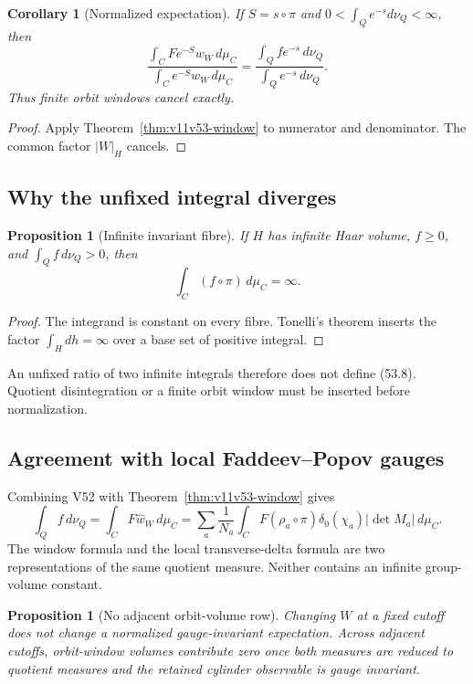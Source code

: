 \documentclass[11pt]{article}
\newtheorem{proposition}[theorem]{Proposition}
\newtheorem{corollary}[theorem]{Corollary}
\begin{document}
\begin{corollary}[Normalized expectation]
\label{cor:v11v53-normalized}
If \(S=s\circ\pi\) and
\(0<\int_Qe^{-s}d\nu_Q<\infty\), then
\[
 \frac{\int_CF e^{-S}w_W\,d\mu_C}
      {\int_Ce^{-S}w_W\,d\mu_C}
 =\frac{\int_Qf e^{-s}\,d\nu_Q}
       {\int_Qe^{-s}\,d\nu_Q}.                               \tag{53.8}
\]
Thus finite orbit windows cancel exactly.
\end{corollary}

\begin{proof}
Apply Theorem~\ref{thm:v11v53-window} to numerator and denominator.
The common factor \(|W|_H\) cancels.
\end{proof}

\subsection{Why the unfixed integral diverges}

\begin{proposition}[Infinite invariant fibre]
\label{prop:v11v53-divergence}
If \(H\) has infinite Haar volume, \(f\ge0\), and
\(\int_Qf\,d\nu_Q>0\), then
\[
                         \int_C(f\circ\pi)\,d\mu_C=\infty.     \tag{53.9}
\]
\end{proposition}

\begin{proof}
The integrand is constant on every fibre.  Tonelli's theorem inserts
the factor \(\int_Hdh=\infty\) over a base set of positive integral.
\end{proof}

An unfixed ratio of two infinite integrals therefore does not define
(53.8).  Quotient disintegration or a finite orbit window must be
inserted before normalization.

\subsection{Agreement with local Faddeev--Popov gauges}

Combining V52 with Theorem~\ref{thm:v11v53-window} gives
\[
 \int_Qf\,d\nu_Q
 =\int_CF\widehat w_W\,d\mu_C
 =\sum_a\frac1{N_a}\int_C
  F(\rho_a\circ\pi)\delta_0(\chi_a)|\det M_a|\,d\mu_C.        \tag{53.10}
\]
The window formula and the local transverse-delta formula are two
representations of the same quotient measure.  Neither contains an
infinite group-volume constant.

\begin{proposition}[No adjacent orbit-volume row]
\label{prop:v11v53-adjacent}
Changing \(W\) at a fixed cutoff does not change a normalized
gauge-invariant expectation.  Across adjacent cutoffs, orbit-window
volumes contribute zero once both measures are reduced to quotient
measures and the retained cylinder observable is gauge invariant.
\end{proposition}
\end{document}
